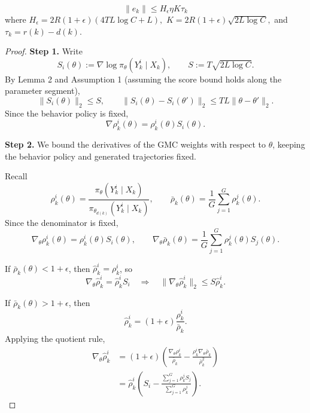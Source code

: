 \begin{lemma} \label{lem:gmc_error}
    $$\|e_k\| \le H_\epsilon\eta K\tau_k$$
    where
    $
    H_\epsilon
    =
    2R(1+\epsilon)(4TL\log C+L),
    $
    $
    K=2R(1+\epsilon)\sqrt{2L\log C},$ and
    $\tau_k=r(k)-d(k).$
\end{lemma}

\begin{proof}

\textbf{Step 1.} Write
\begin{equation*}
S_i(\theta):=\nabla\log\pi_\theta(Y_k^i\mid X_k),
\qquad
S:=T\sqrt{2L\log C}.
\end{equation*}
By Lemma 2 and Assumption 1 (assuming the score bound holds along the parameter segment),
\begin{equation*}
\|S_i(\theta)\|_2\le S,
\qquad
\|S_i(\theta)-S_i(\theta')\|_2
\le TL\|\theta-\theta'\|_2.
\end{equation*}
Since the behavior policy is fixed,
\begin{equation*}
\nabla\rho_k^i(\theta)=\rho_k^i(\theta)S_i(\theta).
\end{equation*}


\textbf{Step 2.} We bound the derivatives of the GMC weights with respect to $\theta$, keeping the behavior policy and generated trajectories fixed.

Recall
\begin{equation*}
\rho_k^i(\theta)
=
\frac{\pi_\theta(Y_k^i\mid X_k)}
{\pi_{\theta_{d(k)}}(Y_k^i\mid X_k)},
\qquad
\bar\rho_k(\theta)=\frac1G\sum_{j=1}^G\rho_k^j(\theta).
\end{equation*}
Since the denominator is fixed,
\begin{equation*}
\nabla_\theta\rho_k^i(\theta)
=\rho_k^i(\theta)S_i(\theta),
\qquad
\nabla_\theta\bar\rho_k(\theta)
=\frac1G\sum_{j=1}^G\rho_k^j(\theta)S_j(\theta).
\end{equation*}

If $\bar\rho_k(\theta)<1+\epsilon$, then
$\hat\rho_k^i=\rho_k^i$, so
\begin{equation*}
\nabla_\theta\hat\rho_k^i
=\hat\rho_k^i S_i
\quad\Rightarrow\quad
\|\nabla_\theta\hat\rho_k^i\|_2
\le S\hat\rho_k^i.
\end{equation*}

If $\bar\rho_k(\theta)>1+\epsilon$, then
\begin{equation*}
\hat\rho_k^i
=(1+\epsilon)\frac{\rho_k^i}{\bar\rho_k}.
\end{equation*}
Applying the quotient rule,
\begin{align*}
\nabla_\theta\hat\rho_k^i
&=(1+\epsilon)
\left(
\frac{\nabla_\theta\rho_k^i}{\bar\rho_k}
-\frac{\rho_k^i\nabla_\theta\bar\rho_k}
{\bar\rho_k^2}
\right)\\
&=\hat\rho_k^i
\left(
S_i-
\frac{\sum_{j=1}^G\rho_k^j S_j}
{\sum_{j=1}^G\rho_k^j}
\right).
\end{align*}


\end{proof}
